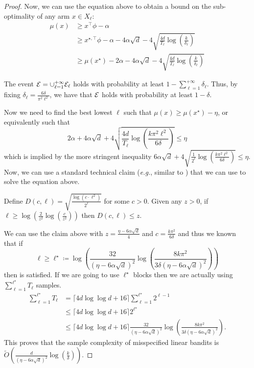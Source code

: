 \begin{proof}
    Now, we can use the equation above to obtain a bound on the sub-optimality of any arm $x\in X_\ell$:
    \begin{align*}
        \mu(x)&\ge x^\top \phi-\alpha\\
        &\ge x^{\star,\top} \phi-\alpha- 4\alpha\sqrt{d}-4\sqrt{\frac{4d}{T_\ell}\log\left(\frac{k}{\delta_\ell}\right)}\\
        &\ge \mu(x^\star)-2\alpha- 4\alpha\sqrt{d}-4\sqrt{\frac{4d}{T_\ell}\log\left(\frac{k}{\delta_\ell}\right)}
    \end{align*}

    The event $\mathcal{E}=\cup_{\ell=1}^{+\infty}\mathcal{E}_{\ell}$ holds with probability at least $1-\sum_{\ell=1}^{+\infty}\delta_\ell$. Thus, by fixing $\delta_\ell = \frac{6\delta}{\pi^2\ell^2}$, we have that $\mathcal{E}$ holds with probability at least $1-\delta$.

    Now we need to find the best lowest $\ell$ such that $\mu(x)\ge \mu(x^\star)-\eta$, or equivalently such that
    \begin{equation}\label{eq:tmp7}    
    2\alpha+ 4\alpha\sqrt{d}+4\sqrt{\frac{4d}{T_\ell}\log\left(\frac{k\pi^2\ell^2}{6\delta}\right)}\le \eta
    \end{equation}
    which is implied by the more stringent inequality
    \(
    6\alpha\sqrt{d}+4\sqrt{\frac{1}{2^\ell}\log\left(\frac{k\pi^2\ell^2}{6\delta}\right)}\le \eta.
    \)
    Now, we can use a standard technical claim (\emph{e.g.}, similar to \citet[Lemma~12]{jonsson2020planning}) that we can use to solve the equation above.
    \begin{claim}
        Define $D(c,\ell)=\sqrt{\frac{\log(c\cdot\ell^2)}{2^\ell}}$ for some $c>0$. Given any $z>0$, if $\ell\ge\log\left(\frac{2}{z^2}\log\left(\frac{c}{z^2}\right)\right)$ then $D(c,\ell)\le z$.
    \end{claim}
 
    We can use the claim above with $z=\frac{\eta-6\alpha\sqrt{d}}{4}$ and $c=\frac{k\pi^2}{6\delta}$ and thus we known that if 
    \[
    \ell\ge \ell^\star\coloneqq\log\left(\frac{32}{(\eta-6\alpha\sqrt{d})^2}\log\left(\frac{8k\pi^2}{3\delta (\eta-6\alpha\sqrt{d})^2}\right)\right)
    \]
    then  is satisfied. If we are going to use $\ell^\star$ blocks then we are actually using
    $\sum_{\ell=1}^{\ell^\star} T_\ell$ samples.
    \begin{align*}
        \sum_{\ell=1}^{\ell^\star} T_\ell &=\lceil4d\log\log d+16\rceil\sum_{\ell=1}^{\ell^\star}2^{\ell-1}\\
        &\le\lceil4d\log\log d+16\rceil 2^{\ell^\star}\\
        &\le\lceil4d\log\log d+16\rceil\frac{32}{(\eta-6\alpha\sqrt{d})^2}\log\left(\frac{8k\pi^2}{3\delta (\eta-6\alpha\sqrt{d})^2}\right).
    \end{align*}
    This proves that the sample complexity of misspecified linear bandits is $\tilde O\left(\frac{d}{(\eta-6\alpha\sqrt{d})^2}\log\left(\frac{k}{\delta}\right)\right)$.


\end{proof}
